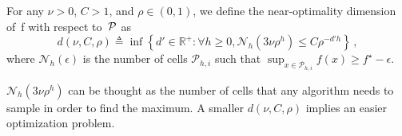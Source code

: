 \begin{definition}
\begin{leftbar}\label{defNearOpt} 
For any $\nu > 0$, $C>1$, and $\rho \in (0,1)$, we define the near-optimality dimension of~f with respect to \,$\mathcal{P}$ as
\[
	d(\nu,C, \rho) \triangleq \inf\left\{d'\in\mathbb{R}^+ : \forall h \geq 0, \mathcal{N}_h(3\nu\rho^h) \leq C\rho^{-d'h}\right\}\,,
\]
where $\mathcal{N}_h(\epsilon)$ is the number of cells $\mathcal{P}_{h,i}$ such that $\sup_{x\in\mathcal{P}_{h,i}}f(x) \geq f^\star - \epsilon$.
\end{leftbar}
\end{definition}
$\mathcal{N}_h(3\nu\rho^h)$ can be thought as the number of cells that any algorithm needs to sample in order to find the maximum. A smaller $d(\nu,C,\rho)$ implies an easier optimization problem.

